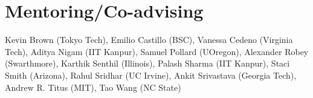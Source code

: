\section{Mentoring/Co-advising}
		{Kevin Brown (Tokyo Tech), Emilio Castillo (BSC), Vanessa Cedeno (Virginia
    Tech),  Aditya Nigam (IIT Kanpur), Samuel Pollard (UOregon), Alexander Robey
    (Swarthmore), Karthik Senthil (Illinois), Palash Sharma (IIT Kanpur),  Staci
    Smith (Arizona), Rahul Sridhar (UC Irvine), Ankit Srivastava (Georgia Tech),
    Andrew R. Titus (MIT), Tao Wang (NC State)}
